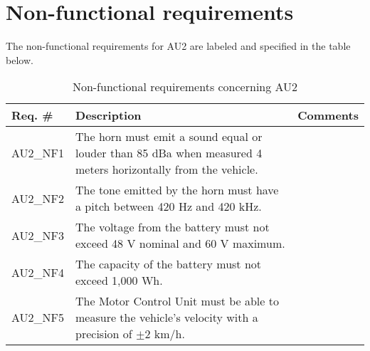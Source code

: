 \section{Non-functional requirements}
The non-functional requirements for AU2 are labeled and specified in the table below.

\begin{table}[h!]
	\centering
	\label{my-label}
	\begin{tabular}{|p{2 cm}|p{7 cm}|p{4 cm}|}
		\hline
		\textbf{Req. \#} & \textbf{Description} & \textbf{Comments} \\\hline
		AU2\_NF1	& The horn must emit a sound equal or louder than 85 dBa when measured 4 meters horizontally from the vehicle. &	\\\hline
		AU2\_NF2	& The tone emitted by the horn must have a pitch between 420 Hz and 420 kHz. &	\\\hline
		AU2\_NF3	& The voltage from the battery must not exceed 48 V nominal and 60 V maximum. &	\\\hline
		AU2\_NF4	& The capacity of the battery must not exceed 1,000 Wh. &	\\\hline
		AU2\_NF5	& The Motor Control Unit must be able to measure the vehicle's velocity with a precision of $\pm$2 km/h. &	\\\hline
	\end{tabular}
	\caption{Non-functional requirements concerning AU2}
\end{table}

